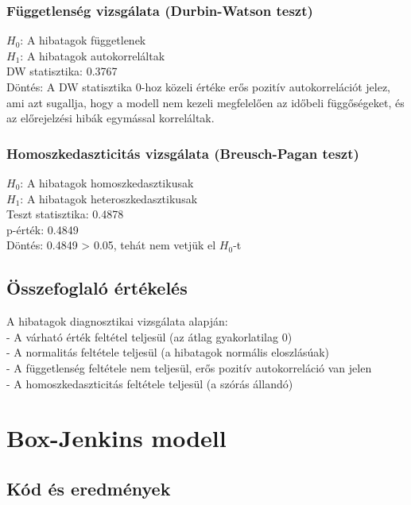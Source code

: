 \documentclass[11pt]{article}
\begin{document}
\subsubsection{Függetlenség vizsgálata (Durbin-Watson
teszt)}\label{fuxfcggetlensuxe9g-vizsguxe1lata-durbin-watson-teszt}

$H_0$: A hibatagok függetlenek\\
$H_1$: A hibatagok autokorreláltak\\
DW statisztika: 0.3767\\
Döntés: A DW statisztika 0-hoz közeli értéke erős pozitív
autokorrelációt jelez, ami azt sugallja, hogy a modell nem kezeli
megfelelően az időbeli függőségeket, és az előrejelzési hibák egymással
korreláltak.

\subsubsection{Homoszkedaszticitás vizsgálata (Breusch-Pagan
teszt)}\label{homoszkedaszticituxe1s-vizsguxe1lata-breusch-pagan-teszt}

$H_0$: A hibatagok homoszkedasztikusak\\
$H_1$: A hibatagok heteroszkedasztikusak\\
Teszt statisztika: 0.4878\\
p-érték: 0.4849\\
Döntés: 0.4849 \textgreater{} 0.05, tehát nem vetjük el $H_0$-t

\subsection{Összefoglaló
értékelés}\label{uxf6sszefoglaluxf3-uxe9rtuxe9keluxe9s}

A hibatagok diagnosztikai vizsgálata alapján:\\
- A várható érték feltétel teljesül (az átlag gyakorlatilag 0)\\
- A normalitás feltétele teljesül (a hibatagok normális eloszlásúak)\\
- A függetlenség feltétele nem teljesül, erős pozitív autokorreláció van
jelen\\
- A homoszkedaszticitás feltétele teljesül (a szórás állandó)

    \section{Box-Jenkins modell}\label{box-jenkins-modell}

\subsection{Kód és eredmények}\label{kuxf3d-uxe9s-eredmuxe9nyek}
\end{document}
